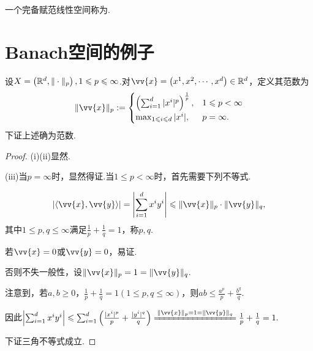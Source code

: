 \begin{definition}[Banach空间]
    一个完备赋范线性空间称为.
\end{definition}

\section{Banach空间的例子}

\begin{instance}[$p-\!\!$范数]
    设$X=\left(\mathbb{R}^d,\|\cdot\|_p\right),1\leqslant p\leqslant \infty$.对$\vv{x}=\left(x^1,x^2,\cdots,x^d\right)\in\mb{R}^d$，定义其范数为
        \begin{equation*}
        \|\vv{x}\|_p:=\begin{cases}
    \left(\sum_{i=1}^d|x^i|^p\right)^{\frac{1}{p}},&1\leq p<\infty\\
    \max_{1\leq i\leq d}|x^i|,&p=\infty.
    \end{cases}
\end{equation*}
    下证上述确为范数.\par
    \begin{proof}
        (i)(ii)显然.\par
        (iii)当$p=\infty$时，显然得证.当$1\leq p<\infty$时，首先需要下列不等式.
        \begin{lemma}[Hölder不等式]
            \begin{equation*}
                \left|\langle \vv{x},\vv{y}\rangle\right|=\left|\sum_{i=1}^d{x^iy^i}\right|\leq\|\vv{x}\|_p\cdot\|\vv{y}\|_q,
            \end{equation*}
            其中$1\leq p,q\leq\infty$满足$\frac{1}{p}+\frac{1}{q}=1$，称$p,q$\;.
        \end{lemma}
        \begin{sproof}
            若$\vv{x}=0$或$\vv{y}=0$，易证.\par
            否则不失一般性，设$\|\vv{x}\|_p=1=\|\vv{y}\|_q$.\par
            注意到，若$a,b\geq 0$，$\frac{1}{p}+\frac{1}{q}=1(1\leq p,q\leq\infty)$，则$ab\leq\frac{a^p}{p}+\frac{b^q}{q}$.\par
            因此$\left|\sum_{i=1}^d{x^iy^i}\right| \leq \sum_{i=1}^d\left(\frac{|x^i|^p}{p}+\frac{|y^i|^q}{q}\right) \xlongequal{\|\vv{x}\|_p=1=\|\vv{y}\|_q}\frac{1}{p}+\frac{1}{q}=1.$
        \end{sproof}
        下证三角不等式成立.\par

\end{proof}
\end{instance}
